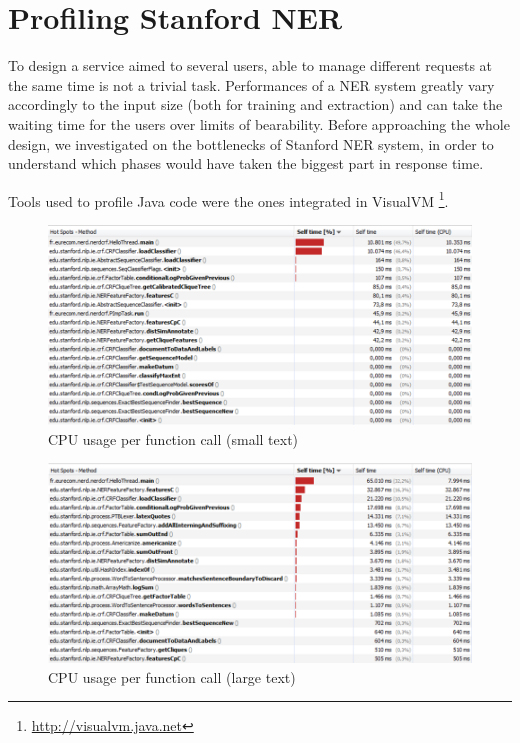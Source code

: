 \documentclass[a4paper,11pt]{report}
\begin{document}
\section{Profiling Stanford NER}
To design a service aimed to several users, able to manage different requests at the same time is not a trivial task. Performances of a NER system greatly vary accordingly to the input size (both for training and extraction) and can take the waiting time for the users over limits of bearability. Before approaching the whole design, we investigated on the bottlenecks of Stanford NER system, in order to understand which phases would have taken the biggest part in response time.

Tools used to profile Java code were the ones integrated in VisualVM \footnote{\url{http://visualvm.java.net}}.

\begin{figure}[htbp] 
\centering
\includegraphics[width=\textwidth]{functions}
\caption{CPU usage per function call (small text)}
\label{fig:profile1}
\end{figure}

\begin{figure}[htbp] 
\centering
\includegraphics[width=\textwidth]{functions2}
\caption{CPU usage per function call (large text)}
\label{fig:profile2}
\end{figure}
\end{document}
